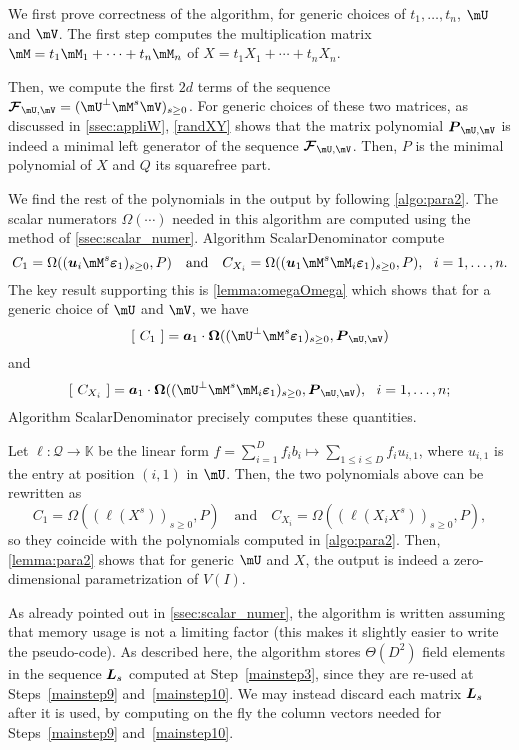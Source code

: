 \documentclass[12pt]{article}
\newcommand{\mat}[1]{\bm{\MakeUppercase{#1}}} %
\newcommand{\row}[1]{\bm{\MakeLowercase{#1}}} %
\newcommand{\col}[1]{\bm{\MakeLowercase{#1}}} %
\newcommand{\seq}{\mat{\mathcal{F}}} %
\newcommand{\minpoly}{P}
\newcommand{\lf}{X}
\newcommand{\residueI}{\mathscr{Q}}
\newcommand{\sqfree}{Q}
\def\K{\mathbb{K}}
\def\K {\ensuremath{\mathbb{K}}}
\begin{document}
We first prove correctness of the algorithm, for generic choices of
$t_1,\dots,t_n$, $\mU$ and $\mV$. The first step computes the
multiplication matrix $\mM=t_1 \mM_1 + \cdots + t_n \mM_n$ of $\lf=t_1
X_1 + \cdots + t_n X_n$.

Then, we compute the first $2d$ terms of the sequence $\seq_{\mU,\mV}=
(\mU^{\perp}\mM^s\mV)_{s\ge 0}$. For generic choices of these two
matrices, as discussed in \cref{ssec:appliW}, \cref{randXY} shows that
the matrix polynomial $\mat{P}_{\mU,\mV}$ is indeed a minimal left
generator of the sequence $\seq_{\mU,\mV}$. Then, $\minpoly$ is the minimal 
polynomial of $\lf$ and $\sqfree$ its squarefree part.

We find the rest of the polynomials in the output by following
\cref{algo:para2}. The scalar numerators $\Omega(\cdots)$ needed in
this algorithm are computed using the method of
\cref{ssec:scalar_numer}. Algorithm ScalarDenominator
compute $$C_1 = \Omega((\row{u}_i \mM^s \col{\varepsilon}_1)_{s \ge 0}, \minpoly)
\quad\text{and}\quad
C_{X_i} = \Omega((\row{u}_1 \mM^s \mM_i \col{\varepsilon}_1)_{s \ge 0}, \minpoly),\ \ i=1,\dots,n.$$
The key result supporting this is \cref{lemma:omegaOmega} which shows
that for a generic choice of $\mU$ and $\mV$, we have 
$$[~C_1~] = \row{a}_1\cdot \mat{\Omega}((\mU^\perp \mM^s \col{\varepsilon}_1)_{s \ge 0}, \mat{P}_{\mU,\mV})$$
and
$$[~C_{X_i}~] = \row{a}_1\cdot \mat{\Omega}((\mU^\perp \mM^s \mM_i \col{\varepsilon}_1)_{s \ge 0}, \mat{P}_{\mU,\mV}),\ \ i=1,\dots,n;
$$
Algorithm ScalarDenominator precisely computes these quantities.

Let $\ell:\residueI \to \K$ be the linear form $f = \sum_{i=1}^D f_i b_i \mapsto 
\sum_{1 \le i \le D} f_i u_{i,1}$, where $u_{i,1}$ is the entry at position
$(i,1)$ in $\mU$. Then, the two polynomials above can be rewritten
as 
$$C_1 = \Omega( (\ell(X^s))_{s \ge 0}, \minpoly) \quad\text{and}\quad
C_{X_i} = \Omega( (\ell(X_i X^s))_{s \ge 0}, \minpoly),$$ so they
coincide with the polynomials computed in \cref{algo:para2}.  Then,
\cref{lemma:para2} shows that for generic $\mU$ and $\lf$, the output
is indeed a zero-dimensional parametrization of $V(I)$.  

\begin{remark}
  As already pointed out in \cref{ssec:scalar_numer}, the algorithm is
  written assuming that memory usage is not a limiting factor (this
  makes it slightly easier to write the pseudo-code). As described
  here, the algorithm stores $\Theta(D^2)$ field elements in the
  sequence $\mat{L}_s$ computed at Step~\ref{mainstep3}, since they
  are re-used at Steps~\ref{mainstep9} and~\ref{mainstep10}.  We may
  instead discard each matrix $\mat{L}_s$ after it is used, by
  computing on the fly the column vectors needed for Steps~\ref{mainstep9}
  and~\ref{mainstep10}.
\end{remark}
\end{document}
